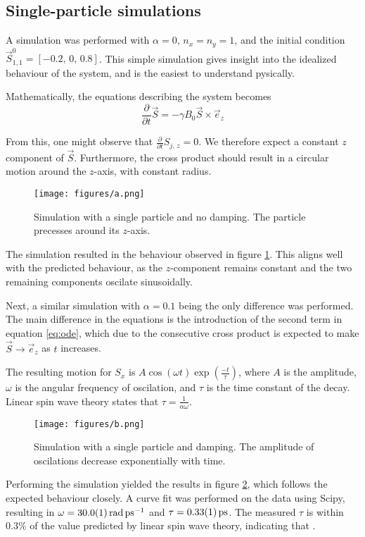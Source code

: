 \subsection*{Single-particle simulations}
A simulation was performed with $\alpha = 0$, $n_x = n_y = 1$, and the initial condition 
$\vec{S}_{1,1}^0 = \left[-0.2,\, 0,\, 0.8\right]$. 
This simple simulation gives insight into the idealized behaviour of the system, 
and is the easiest to understand pysically.

Mathematically, the equations describing the system becomes
\begin{equation*}
    \frac{\partial}{\partial t} \vec{S} = -\gamma B_0\vec{S}\times\vec{e}_z
\end{equation*}

From this, one might observe that $\frac{\partial}{\partial t}S_{j,\,z} = 0$. 
We therefore expect a constant $z$ component of $\vec{S}$.
Furthermore, the cross product should result in a circular motion around the $z$-axis, 
with constant radius.

\begin{figure}
    \centering
    \texttt{[image: figures/a.png]}
    \caption{Simulation with a single particle and no damping. 
    The particle precesses around its $z$-axis.}
    \label{fig:a}
\end{figure}

The simulation resulted in the behaviour observed in figure \ref{fig:a}. 
This aligns well with the predicted behaviour, as the $z$-component remains constant and
the two remaining components oscilate sinusoidally.

Next, a similar simulation with $\alpha = 0.1$ being the only difference was performed. 
The main difference in the equations is the introduction of the second term in equation \ref{eq:ode}, 
which due to the consecutive cross product is expected to make 
$\vec{S} \rightarrow \vec{e}_z$ as $t$ increases. 

The resulting motion for $S_x$ is $A\cos(\omega t)\exp(\frac{-t}{\tau})$, 
where $A$ is the amplitude, $\omega$ is the angular frequency of oscilation, 
and $\tau$ is the time constant of the decay. 
Linear spin wave theory states that $\tau = \frac{1}{\alpha\omega}$.

\begin{figure}
    \centering
    \texttt{[image: figures/b.png]}
    \caption{
        Simulation with a single particle and damping. 
        The amplitude of oscilations decrease exponentially with time.
    }
    \label{fig:b}
\end{figure}

Performing the simulation yielded the results in figure \ref{fig:b}, 
which follows the expected behaviour closely. A curve fit was performed on the data using Scipy, 
resulting in $\omega = \SI{30.0\pm0.1}{\radian\per\pico\second}$ and $\tau = \SI{0.33\pm0.01}{\pico\second}$.
The measured $\tau$ is within 0.3\% of the value predicted by linear spin wave theory, 
indicating that .

